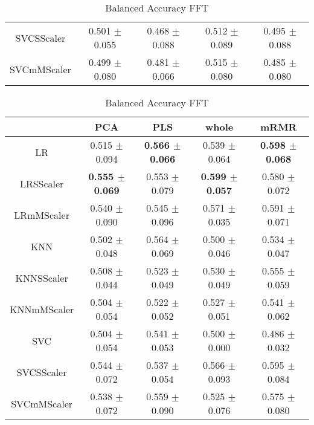 \documentclass[]{report}
\begin{document}
\begin{table}
\begin{tabular}{c|cccc}
			 SVCSScaler  & 0.501 $\pm$ 0.055 & 0.468 $\pm$ 0.088 & 0.512 $\pm$ 0.089 & 0.495 $\pm$ 0.088 \\
			 SVCmMScaler & 0.499 $\pm$ 0.080 & 0.481 $\pm$ 0.066 & 0.515 $\pm$ 0.080 & 0.485 $\pm$ 0.080 \\
			\hline
		\end{tabular}
		\caption{\label{tab:bal_acc_DCOR} Balanced Accuracy DCOR}
		\vspace*{2cm}
		\begin{tabular}{c|cccc}
			\hline
			             & PCA             & PLS             & whole           & mRMR            \\
			\hline
			 LR          & 0.515 $\pm$ 0.094 & \textbf{0.566 $\pm$ 0.066} & 0.539 $\pm$ 0.064 & \textbf{0.598 $\pm$ 0.068} \\
			 LRSScaler   & \textbf{0.555 $\pm$ 0.069} & 0.553 $\pm$ 0.079 & \textbf{0.599 $\pm$ 0.057} & 0.580 $\pm$ 0.072 \\
			 LRmMScaler  & 0.540 $\pm$ 0.090 & 0.545 $\pm$ 0.096 & 0.571 $\pm$ 0.035 & 0.591 $\pm$ 0.071 \\
			 KNN         & 0.502 $\pm$ 0.048 & 0.564 $\pm$ 0.069 & 0.500 $\pm$ 0.046 & 0.534 $\pm$ 0.047 \\
			 KNNSScaler  & 0.508 $\pm$ 0.044 & 0.523 $\pm$ 0.049 & 0.530 $\pm$ 0.049 & 0.555 $\pm$ 0.059 \\
			 KNNmMScaler & 0.504 $\pm$ 0.054 & 0.522 $\pm$ 0.052 & 0.527 $\pm$ 0.051 & 0.541 $\pm$ 0.062 \\
			 SVC         & 0.504 $\pm$ 0.054 & 0.541 $\pm$ 0.053 & 0.500 $\pm$ 0.000 & 0.486 $\pm$ 0.032 \\
			 SVCSScaler  & 0.544 $\pm$ 0.072 & 0.537 $\pm$ 0.054 & 0.566 $\pm$ 0.093 & 0.595 $\pm$ 0.084 \\
			 SVCmMScaler & 0.538 $\pm$ 0.072 & 0.559 $\pm$ 0.090 & 0.525 $\pm$ 0.076 & 0.575 $\pm$ 0.080 \\
			\hline
		\end{tabular}
		\caption{\label{tab:bal_acc_FFT} Balanced Accuracy FFT}
		\vspace*{2cm}
	\end{table}
\end{document}
